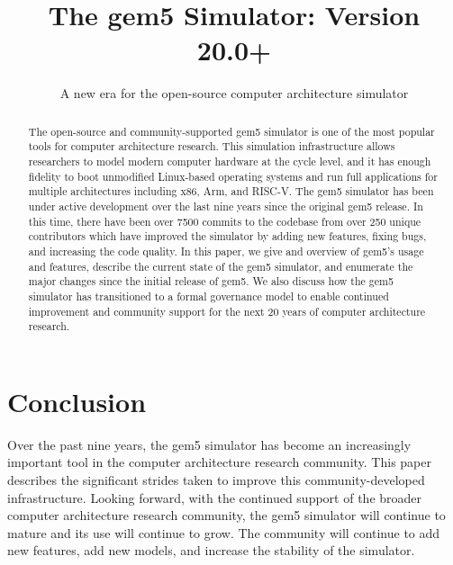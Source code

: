 \documentclass[sigconf,nonacm,screen=true]{acmart}
\begin{document}
\title{The gem5 Simulator: Version 20.0+}
\subtitle{A new era for the open-source computer architecture simulator}



\begin{abstract}
    The open-source and community-supported gem5 simulator is one of the most popular tools for computer architecture research.
    This simulation infrastructure allows researchers to model modern computer hardware at the cycle level, and it has enough fidelity to boot unmodified Linux-based operating systems and run full applications for multiple architectures including x86, Arm\textregistered, and RISC-V.
    The gem5 simulator has been under active development over the last nine years since the original gem5 release.
    In this time, there have been over 7500 commits to the codebase from over 250 unique contributors which have improved the simulator by adding new features, fixing bugs, and increasing the code quality.
    In this paper, we give and overview of gem5's usage and features, describe the current state of the gem5 simulator, and enumerate the major changes since the initial release of gem5.
    We also discuss how the gem5 simulator has transitioned to a formal governance model to enable continued improvement and community support for the next 20 years of computer architecture research.
\end{abstract}

\maketitle
\renewcommand{\shortauthors}{Lowe-Power and the gem5 Community}





\section{Conclusion}

Over the past nine years, the gem5 simulator has become an increasingly important tool in the computer architecture research community.
This paper describes the significant strides taken to improve this community-developed infrastructure.
Looking forward, with the continued support of the broader computer architecture research community, the gem5 simulator will continue to mature and its use will continue to grow.
The community will continue to add new features, add new models, and increase the stability of the simulator.
\end{document}
